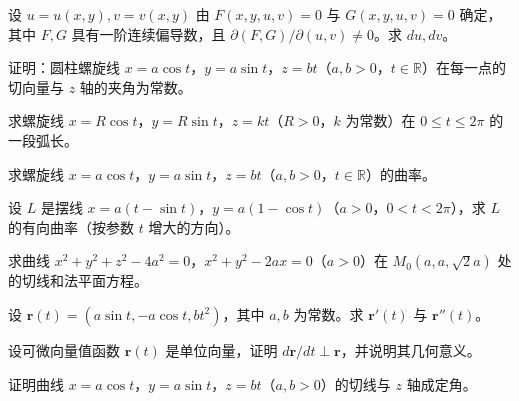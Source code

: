 \newpage
\noindent\begin{minipage}{\textwidth}
设 $u=u(x,y),v=v(x,y)$ 由 $F(x,y,u,v)=0$ 与 $G(x,y,u,v)=0$ 确定，其中 $F,G$ 具有一阶连续偏导数，且 $\partial(F,G)/\partial(u,v)\ne0$。求 $du,dv$。
\end{minipage}\par\vfill
\noindent\begin{minipage}{\textwidth}
证明：圆柱螺旋线 $x=a\cos t$，$y=a\sin t$，$z=bt$（$a,b>0$，$t\in\mathbb R$）在每一点的切向量与 $z$ 轴的夹角为常数。
\end{minipage}\par\vfill
\noindent\begin{minipage}{\textwidth}
求螺旋线 $x=R\cos t$，$y=R\sin t$，$z=kt$（$R>0$，$k$ 为常数）在 $0\le t\le2\pi$ 的一段弧长。
\end{minipage}\par\vfill
\noindent\begin{minipage}{\textwidth}
求螺旋线 $x=a\cos t$，$y=a\sin t$，$z=bt$（$a,b>0$，$t\in\mathbb R$）的曲率。
\end{minipage}\par\vfill
\newpage
\noindent\begin{minipage}{\textwidth}
设 $L$ 是摆线 $x=a(t-\sin t)$，$y=a(1-\cos t)$（$a>0$，$0<t<2\pi$），求 $L$ 的有向曲率（按参数 $t$ 增大的方向）。
\end{minipage}\par\vfill
\noindent\begin{minipage}{\textwidth}
求曲线 $x^2+y^2+z^2-4a^2=0$，$x^2+y^2-2ax=0$（$a>0$）在 $M_0(a,a,\sqrt2a)$ 处的切线和法平面方程。
\end{minipage}\par\vfill
\noindent\begin{minipage}{\textwidth}
设 $\boldsymbol r(t)=(a\sin t,-a\cos t,bt^2)$，其中 $a,b$ 为常数。求 $\boldsymbol r'(t)$ 与 $\boldsymbol r''(t)$。
\end{minipage}\par\vfill
\noindent\begin{minipage}{\textwidth}
设可微向量值函数 $\boldsymbol r(t)$ 是单位向量，证明 $d\boldsymbol r/dt\perp\boldsymbol r$，并说明其几何意义。
\end{minipage}\par\vfill
\newpage
\noindent\begin{minipage}{\textwidth}
证明曲线 $x=a\cos t$，$y=a\sin t$，$z=bt$（$a,b>0$）的切线与 $z$ 轴成定角。
\end{minipage}\par\vfill
